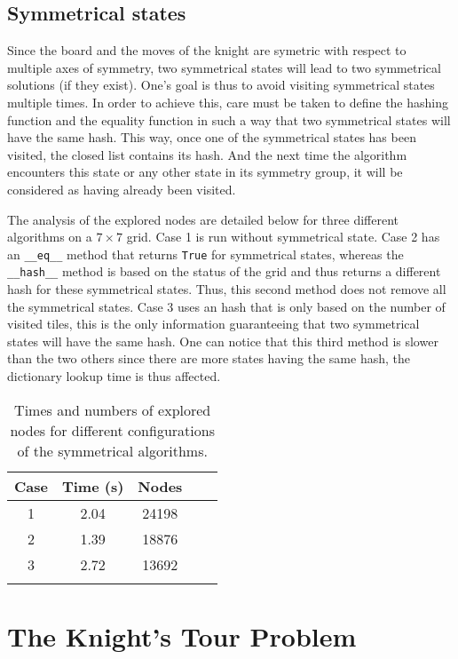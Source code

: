 \documentclass[journal]{IEEEtran}
\newcommand{\py}[1]{\texttt{#1}}
\begin{document}
 \subsection{Symmetrical states} Since the board and the moves of the knight are symetric with respect to multiple axes of symmetry, two symmetrical states will lead to two symmetrical solutions (if they exist). One's goal is thus to avoid visiting symmetrical states multiple times. 
 In order to achieve this, care must be taken to define the hashing function and the equality function in such a way that two symmetrical states will have the same hash.
 This way, once one of the symmetrical states has been visited, the closed list contains its hash. And the next time the algorithm encounters this state or any other state in its symmetry group, it will be considered as having already been visited.
 
 The analysis of the explored nodes are detailed below for three different algorithms on a $7\times7$ grid. Case 1 is run without symmetrical state. Case 2 has an \py{__eq__} method that returns \py{True} for symmetrical states, whereas the \py{__hash__} method is based on the status of the grid and thus returns a different hash for these symmetrical states. Thus, this second method does not remove all the symmetrical states. Case 3 uses an hash that is only based on the number of visited tiles, this is the only information guaranteeing that two symmetrical states will have the same hash. One can notice that this third method is slower than the two others since there are more states having the same hash, the dictionary lookup time is thus affected.
 
\begin{table}[!hbtp]
	\centering
\begin{tabular}{ccccc} 
 \toprule
  Case & Time (\si{\second}) & Nodes\\
  \midrule
 1 & 2.04 & 24198\\
 2 & 1.39 & 18876\\
 3 & 2.72 & 13692\\
 \bottomrule\\
\end{tabular}
\caption{Times and numbers of explored nodes for different configurations of the symmetrical algorithms.}
\end{table}

\section{The Knight’s Tour Problem}
\end{document}

